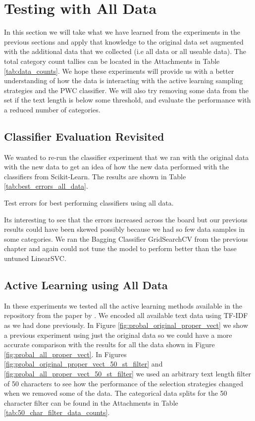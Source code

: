 \chapter{Testing with All Data}
\label{sec:proper_vectorization}

In this section we will take what we have learned from the experiments in the previous sections and apply that knowledge to the original data set augmented with the additional data that we collected (i.e all data or all useable data). The total category count tallies can be located in the Attachments in Table \ref{tab:data_counts}. We hope these experiments will provide us with a better understanding of how the data is interacting with the active learning sampling strategies and the PWC classifier. We will also try removing some data from the set if the text length is below some threshold, and evaluate the performance with a reduced number of categories.

\section{Classifier Evaluation Revisited}

We wanted to re-run the classifier experiment that we ran with the original data with the new data to get an idea of how the new data performed with the classifiers from Scikit-Learn. The results are shown in Table \ref{tab:best_errors_all_data}.

\begin{table}[ht]
    \centering
    \caption{Test errors for best performing classifiers using all data.}
    
    \label{tab:best_errors_all_data}
\end{table}

Its interesting to see that the errors increased across the board but our previous results could have been skewed possibly because we had so few data samples in some categories. We ran the Bagging Classifier GridSearchCV from the previous chapter and again could not tune the model to perform better than the base untuned LinearSVC.

\section{Active Learning using All Data}

In these experiments we tested all the active learning methods available in the repository from the paper by \cite{kottke2021toward}. We encoded all available text data using TF-IDF as we had done previously. In Figure \ref{fig:probal_original_proper_vect} we show a previous experiment using just the original data so we could have a more accurate comparison with the results for all the data shown in Figure \ref{fig:probal_all_proper_vect}. In Figures \ref{fig:probal_original_proper_vect_50_st_filter} and \ref{fig:probal_all_proper_vect_50_st_filter} we used an arbitrary text length filter of 50 characters to see how the performance of the selection strategies changed when we removed some of the data. The categorical data splits for the 50 character filter can be found in the Attachments in Table \ref{tab:50_char_filter_data_counts}.

